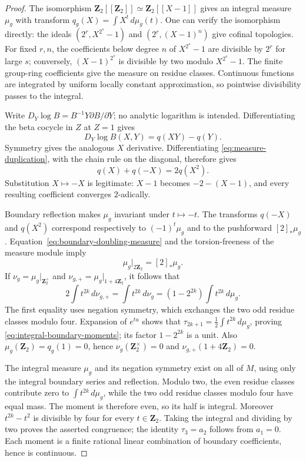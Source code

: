 \begin{proof}
The isomorphism
$\mathbf Z_2[[\mathbf Z_2]]\simeq\mathbf Z_2[[X-1]]$ gives an integral
measure $\mu_g$ with transform $q_g(X)=\int X^t\,d\mu_g(t)$.
One can verify the isomorphism directly: the ideals
$(2^r,X^{2^s}-1)$ and $(2^r,(X-1)^n)$ give cofinal topologies.
For fixed $r,n$, the coefficients below degree $n$ of $X^{2^s}-1$
are divisible by $2^r$ for large $s$; conversely,
$(X-1)^{2^s}$ is divisible by two modulo $X^{2^s}-1$.
The finite group-ring coefficients give the measure on residue classes.
Continuous functions are integrated by uniform locally constant
approximation, so pointwise divisibility passes to the integral.

Write $D_Y\log B=B^{-1}Y\partial B/\partial Y$; no analytic
logarithm is intended.  Differentiating the beta cocycle in $Z$ at
$Z=1$ gives
\[
 D_Y\log B(X,Y)=q(XY)-q(Y).
\]
Symmetry gives the analogous $X$ derivative.  Differentiating
\eqref{eq:measure-duplication}, with the chain rule on the diagonal,
therefore gives
\begin{equation}
 q(X)+q(-X)=2q(X^2).\label{eq:boundary-doubling-measure}
\end{equation}
Substitution $X\mapsto-X$ is legitimate: $X-1$ becomes
$-2-(X-1)$, and every resulting coefficient converges $2$-adically.

Boundary reflection makes $\mu_g$ invariant under $t\mapsto-t$.
The transforms $q(-X)$ and $q(X^2)$ correspond respectively to
$(-1)^t\mu_g$ and to the pushforward $[2]_*\mu_g$.
Equation~\eqref{eq:boundary-doubling-measure} and the torsion-freeness
of the measure module imply
\[
 \mu_g|_{2\mathbf Z_2}=[2]_*\mu_g.
\]
If $\nu_g=\mu_g|_{\mathbf Z_2^\times}$ and
$\nu_{g,+}=\mu_g|_{1+4\mathbf Z_2}$, it follows that
\[
 2\int t^{2k}\,d\nu_{g,+}
 =\int t^{2k}\,d\nu_g
 =(1-2^{2k})\int t^{2k}\,d\mu_g.
\]
The first equality uses negation symmetry, which exchanges the two
odd residue classes modulo four.  Expansion of $e^{tu}$ shows that
$\tau_{2k+1}=\tfrac12\int t^{2k}\,d\mu_g$, proving
\eqref{eq:integral-boundary-moments}; its factor $1-2^{2k}$ is a unit.
Also $\mu_g(\mathbf Z_2)=q_g(1)=0$, hence
$\nu_g(\mathbf Z_2^\times)=0$ and $\nu_{g,+}(1+4\mathbf Z_2)=0$.

The integral measure $\mu_g$ and its negation symmetry exist on all
of $M$, using only the integral boundary series and reflection.
Modulo two, the even residue classes contribute zero to
$\int t^{2k}\,d\mu_g$, while the two odd residue classes modulo four
have equal mass. The moment is therefore even, so its half is
integral. Moreover $t^{2k}-t^2$ is divisible by four for every
$t\in\mathbf Z_2$. Taking the integral and dividing by two proves
the asserted congruence; the identity $\tau_3=a_2$ follows from
$a_1=0$. Each moment is a finite rational linear combination of
boundary coefficients, hence is continuous.


\end{proof}
